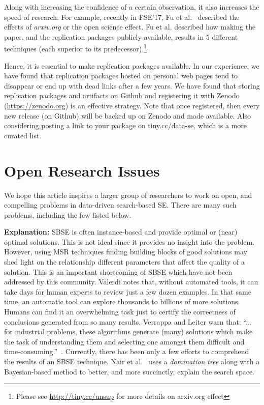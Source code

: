 \documentclass[sigconf,anonymous,review]{acmart}
\begin{document}
Along with increasing the confidence of a certain observation, it also increases the speed of research. For example, recently in FSE'17, Fu et al.~\cite{fu2017revisiting} described the effects of \textit{arxiv.org} or the open science effect. Fu et al. described how making the paper, and the replication packages publicly available, results in 5 different techniques (each superior to its predecessor).\footnote{Please see \url{http://tiny.cc/unsup}  for more details on arxiv.org effect} 

Hence, it is essential to make replication packages available. 
In our experience, we have found that replication packages hosted on personal web pages tend to disappear or end up with dead links after a few years.
We have found that storing replication packages and artifacts on Github and registering it with Zenodo (\href{https://zenodo.org}{https://zenodo.org}) is an effective strategy. 
Note that once registered, then every new release (on Github) will be backed up on Zenodo and made available. Also considering posting a link to your package on tiny.cc/data-se, which is a more curated list. 
    
     


\section{Open Research Issues} \label{sec:open}
We hope this article inspires a larger group of researchers to work
on open, and compelling problems
in data-driven search-based SE. There are many such problems, including the few listed below.


  \noindent\textbf{Explanation: } SBSE is often instance-based and provide optimal or (near) optimal solutions. This is not ideal since it provides no insight into the problem. However, using MSR techniques finding
building blocks of good solutions may shed light on the relationship
different parameters that affect the quality of a solution. This is an important shortcoming of SBSE which have not been addressed by this community. Valerdi
notes that, without automated tools, it can take days for human
experts to review just a few dozen examples. In that same
time, an automatic tool can explore thousands to billions of more
solutions. Humans can find it an overwhelming task just to
certify the correctness of conclusions generated from so many
results. Verrappa and Leiter warn that:
``... for industrial problems, these algorithms generate
(many) solutions which make the task of understanding
them and selecting one amongst them difficult
and time-consuming.''~\cite{veerappa2011understanding}. Currently, there has been only a few efforts to comprehend the results of an SBSE technique. Nair et al.~\cite{nair2017flash}
uses a \textit{domination tree} along with a Bayesian-based method to better, and more succinctly,
explain the search space. 
\end{document}
